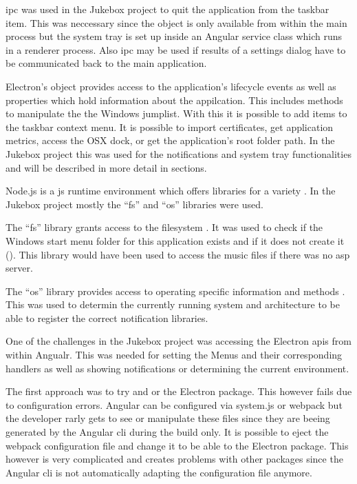 \gls{ipc} was used in the Jukebox project to quit the application from the taskbar item. This was neccessary since the  object is only available from within the main process but the system tray is set up inside an Angular service class which runs in a renderer process. Also \gls{ipc} may be used if results of a \zB settings dialog have to be communicated back to the main application.


Electron's  object provides access to the application's lifecycle events as well as properties which hold information about the appilcation. This includes methods to manipulate the the Windows jumplist. With this it is possible to add items to the taskbar context menu. It is possible to import certificates, get application metrics, access the OSX dock, or get the application's root folder path. In the Jukebox project this was used for the notifications and system tray functionalities and will be described in more detail in  sections.


Node.js is a \gls{js} runtime environment which offers libraries for a variety . In the Jukebox project mostly the \enquote{fs} and \enquote{os} libraries were used.

The \enquote{fs} library grants access to the filesystem \cite{nodejsFS}. It was used to check if the Windows start menu folder for this application exists and if it does not create it (). This library would have been used to access the music files if there was no \gls{asp} server.

The \enquote{os} library provides access to operating specific information and methods \cite{nodejsOS}. This was used to determin the currently running system and architecture to be able to register the correct notification libraries.


One of the challenges in the Jukebox project was accessing the Electron \gls{api}s from within Angualr. This was needed for setting the Menus and their corresponding  handlers as well as showing notifications or determining the current environment.


The first approach was to try and  or  the Electron package. This however fails due to configuration errors. Angular can be configured via system.js or webpack but the developer rarly gets to see or manipulate these files since they are beeing generated by the Angular \gls{cli} during the build only. It is possible to eject the webpack configuration file and change it to be able to  the Electron package. This however is very complicated and creates problems with other packages since the Angular \gls{cli} is not automatically adapting the configuration file anymore. \cite{electronRequireError}

